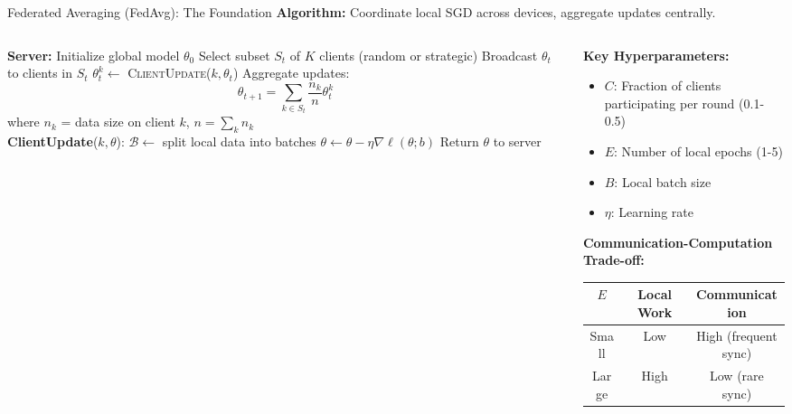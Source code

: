 \begin{frame}{Federated Averaging (FedAvg): The Foundation}
\textbf{Algorithm:} Coordinate local SGD across devices, aggregate updates centrally.

\begin{columns}
\begin{column}{0.5\textwidth}
\begin{algorithm}[H]
\caption{Federated Averaging}
\begin{algorithmic}[1]
\STATE \textbf{Server:}
\STATE Initialize global model $\theta_0$
\STATE Select subset $S_t$ of $K$ clients (random or strategic)
\STATE Broadcast $\theta_t$ to clients in $S_t$
\STATE $\theta_t^k \leftarrow$ \textsc{ClientUpdate}($k, \theta_t$)
\ENDFOR
\STATE Aggregate updates:
\[\theta_{t+1} = \sum_{k \in S_t} \frac{n_k}{n} \theta_t^k\]
where $n_k$ = data size on client $k$, $n = \sum_k n_k$
\ENDFOR
\\
\STATE \textbf{ClientUpdate}($k, \theta$):
\STATE $\mathcal{B} \leftarrow$ split local data into batches
\STATE $\theta \leftarrow \theta - \eta \nabla \ell(\theta; b)$
\ENDFOR
\ENDFOR
\STATE Return $\theta$ to server
\end{algorithmic}
\end{algorithm}
\end{column}
\begin{column}{0.5\textwidth}
\textbf{Key Hyperparameters:}
\begin{itemize}
\item $C$: Fraction of clients participating per round (0.1-0.5)
\item $E$: Number of local epochs (1-5)
\item $B$: Local batch size
\item $\eta$: Learning rate
\end{itemize}

\vspace{0.3cm}
\textbf{Communication-Computation Trade-off:}

\begin{table}
\centering
\small
\begin{tabular}{ccc}
\toprule
\textbf{$E$} & \textbf{Local Work} & \textbf{Communication} \\
\midrule
Small & Low & High (frequent sync) \\
Large & High & Low (rare sync) \\
\bottomrule
\end{tabular}
\end{table}


\end{column}
\end{columns}
\end{frame}
